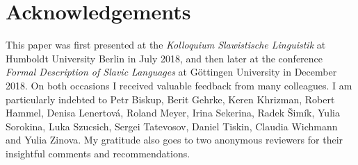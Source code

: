 \documentclass[output=paper,
colorlinks,
citecolor=brown,
newtxmath
]{langscibook}
\begin{document}

\section*{Acknowledgements}

This paper was first presented at the \textit{Kolloquium Slawistische Linguistik} at Humboldt University Berlin in July 2018, and then later at the conference \textit{Formal Description of Slavic Languages} at Göttingen University in December 2018. On both occasions I received valuable feedback from many colleagues. I am particularly indebted to Petr Biskup, Berit Gehrke, Keren Khrizman, Robert Hammel, Denisa Lenertová, Roland Meyer, Irina Sekerina, Radek Šimík, Yulia Sorokina, Luka Szucsich, Sergei Tatevosov, Daniel Tiskin, Claudia Wichmann and Yulia Zinova. My gratitude also goes to two anonymous reviewers for their insightful comments and recommendations.

\sloppy
\printbibliography[heading=subbibliography,notkeyword=this]
\end{document}
